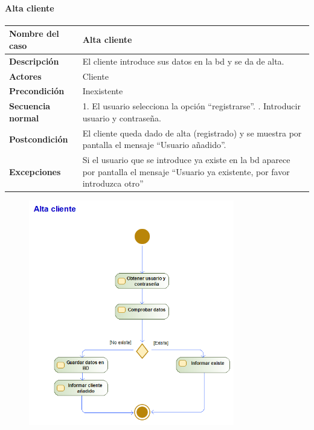 \paragraph{Alta cliente}
\begin{table}[H]
	\centering
	\small
	\begin{tabularx}{0.8\textwidth}{|p{3.5cm}|X|}
		\hline
		\rowcolor{lightgray}
		\textbf{Nombre del caso}  & \textbf{Alta cliente}                                                                                                                       \\
		\hline
		\textbf{Descripción}      & El cliente introduce sus datos en la \gls{bd} y se da de alta.                                                                              \\
		\hline
		\textbf{Actores}          & Cliente                                                                                                                                     \\
		\hline
		\textbf{Precondición}     & Inexistente                                                                                                                                 \\
		\hline
		\textbf{Secuencia normal} & 1. El usuario selecciona la opción ``registrarse''. \newline 2. Introducir usuario y contraseña.                                            \\
		\hline
		\textbf{Postcondición}    & El cliente queda dado de alta (registrado) y se muestra por pantalla el mensaje ``Usuario añadido''.                                        \\
		\hline
		\textbf{Excepciones}      & Si el usuario que se introduce ya existe en la \gls{bd} aparece por pantalla el mensaje ``Usuario ya existente, por favor introduzca otro'' \\
		\hline
	\end{tabularx}
\end{table}
\begin{figure}[H]
	\centering
	\includegraphics[width=0.8\textwidth]{Use_Cases/alta_cliente.png}
\end{figure}
\newpage
